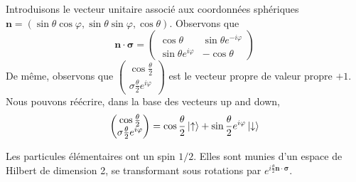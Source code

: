 \documentclass[../notesdecours.tex]{subfiles}
\begin{document}
Introduisons le vecteur unitaire associé aux coordonnées sphériques $\bm{n} = \left(\sin\theta\cos\varphi,\sin\theta\sin\varphi,\cos\theta\right)$. Observons que 
\begin{equation}
    \bm{n}\cdot\bm{\sigma} = \begin{pmatrix}
        \cos\theta & \sin\theta e^{-i\varphi}\\
        \sin\theta e^{i\varphi} & -\cos\theta
    \end{pmatrix}
\end{equation}
De même, observons que $\begin{pmatrix}
    \cos\frac{\theta}{2}\\
    \sigma\frac{\theta}{2}e^{i\varphi}
\end{pmatrix}$ est le vecteur propre de valeur propre $+1$. Nous pouvons réécrire, dans la base des vecteurs up and down,
\begin{equation}
    \begin{pmatrix}
        \cos\frac{\theta}{2}\\
        \sigma\frac{\theta}{2}e^{i\varphi}
    \end{pmatrix} = \cos\frac{\theta}{2}\ket{\uparrow}+\sin\frac{\theta}{2}e^{i\varphi}\ket{\downarrow}
\end{equation}

Les particules élémentaires ont un spin $1/2$. Elles sont munies d'un espace de Hilbert de dimension 2, se transformant sous rotations par $e^{i\frac{\theta}{2}\bm{n}\cdot\bm{\sigma}}$.
\end{document}
